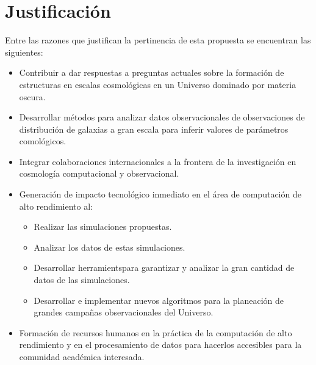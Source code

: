 
\section{Justificaci\'on}

Entre las razones que justifican la pertinencia de esta propuesta se
encuentran las siguientes:

\begin{itemize}
\item Contribuir a dar respuestas a preguntas actuales sobre la
  formaci\'on de estructuras en escalas cosmol\'ogicas en un Universo
  dominado por materia oscura.
\item Desarrollar m\'etodos para analizar datos observacionales de
  observaciones de distribuci\'on de galaxias a gran escala para
  inferir valores de par\'ametros comol\'ogicos.
\item Integrar colaboraciones internacionales a la frontera de la
  investigaci\'on en cosmolog\'ia computacional y observacional.
\item Generaci\'on de impacto tecnol\'ogico inmediato en el \'area de
  computaci\'on de alto rendimiento al:
\begin{itemize}
\item Realizar las simulaciones propuestas.
\item Analizar los datos de estas simulaciones.
\item Desarrollar herramientspara garantizar y analizar la
  gran cantidad de datos de las simulaciones.
\item Desarrollar e implementar nuevos algoritmos para la planeaci\'on
  de grandes campa\~nas observacionales del Universo.
\end{itemize}
\item Formaci\'on de recursos humanos en la pr\'actica de la
  computaci\'on de alto rendimiento y en el procesamiento de datos
  para hacerlos accesibles para la comunidad acad\'emica interesada. 
\end{itemize}
